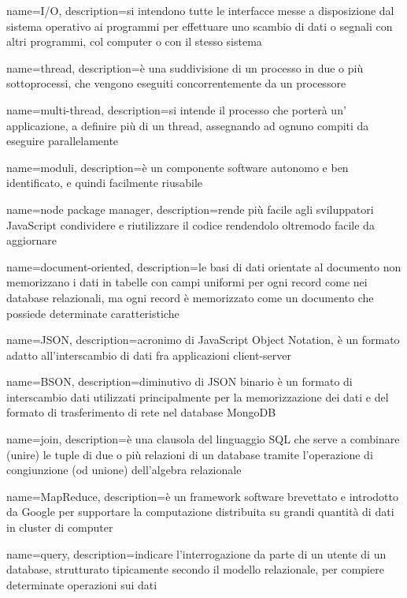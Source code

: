  {
	name=I/O,
	description={si intendono tutte le interfacce messe a disposizione dal sistema operativo ai programmi per effettuare uno scambio di dati o segnali con altri programmi, col computer o con il stesso sistema}
}

 {
	name=thread,
	description={è una suddivisione di un processo in due o più sottoprocessi, che vengono eseguiti concorrentemente da un processore}
}

 {
	name=multi-thread,
	description={si intende il processo che porterà un' applicazione, a definire più di un thread, assegnando ad ognuno compiti da eseguire parallelamente}
}

 {
	name=moduli,
	description={è un componente software autonomo e ben identificato, e quindi facilmente riusabile}
}

 {
	name=node package manager,
	description={rende più facile agli sviluppatori JavaScript condividere e riutilizzare il codice rendendolo oltremodo facile da aggiornare}
}


 {
	name=document-oriented,
	description={le basi di dati orientate al documento non memorizzano i dati in tabelle con campi uniformi per ogni record come nei database relazionali, ma ogni record è memorizzato come un documento che possiede determinate caratteristiche}
}

 {
	name=JSON,
	description={acronimo di JavaScript Object Notation, è un formato adatto all'interscambio di dati fra applicazioni client-server}
}

 {
	name=BSON,
	description={diminutivo di JSON binario è un formato di interscambio dati utilizzati principalmente per la memorizzazione dei dati e del formato di trasferimento di rete nel database MongoDB}
}

 {
	name=join,
	description={è una clausola del linguaggio SQL che serve a combinare (unire) le tuple di due o più relazioni di un database tramite l'operazione di congiunzione (od unione) dell'algebra relazionale}
}

 {
	name=MapReduce,
	description={è un framework software brevettato e introdotto da Google per supportare la computazione distribuita su grandi quantità di dati in cluster di computer}
}

 {
	name=query,
	description={indicare l'interrogazione da parte di un utente di un database, strutturato tipicamente secondo il modello relazionale, per compiere determinate operazioni sui dati}
}


